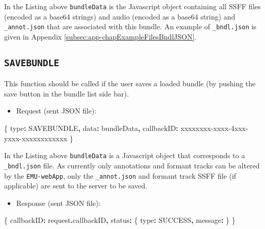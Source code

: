 \documentclass[
]{book}
\newenvironment{Shaded}{\begin{snugshade}}{\end{snugshade}}
\newcommand{\AttributeTok}[1]{\textcolor[rgb]{0.77,0.63,0.00}{#1}}
\newcommand{\NormalTok}[1]{#1}
\newcommand{\OperatorTok}[1]{\textcolor[rgb]{0.81,0.36,0.00}{\textbf{#1}}}
\newcommand{\StringTok}[1]{\textcolor[rgb]{0.31,0.60,0.02}{#1}}
\providecommand{\tightlist}{%
  \setlength{\itemsep}{0pt}\setlength{\parskip}{0pt}}
\begin{document}
In the Listing above \texttt{bundleData} is the Javascript object containing all SSFF files (encoded as a base64 strings) and audio (encoded as a base64 string) and \texttt{\_annot.json} that are associated with this bundle. An example of \texttt{\_bndl.json} is given in Appendix \ref{subsec:app-chapExampleFilesBndlJSON}.

\hypertarget{savebundle}{%
\subsection{\texorpdfstring{\texttt{SAVEBUNDLE}}{SAVEBUNDLE}}\label{savebundle}}

This function should be called if the user saves a loaded bundle (by pushing the save button in the bundle list side bar).

\begin{itemize}
\tightlist
\item
  Request (sent JSON file):
\end{itemize}

\begin{Shaded}
\begin{Highlighting}[]
\NormalTok{\{}
  \StringTok{\textquotesingle{}type\textquotesingle{}}\OperatorTok{:} \StringTok{\textquotesingle{}SAVEBUNDLE\textquotesingle{}}\OperatorTok{,}
  \StringTok{\textquotesingle{}data\textquotesingle{}}\OperatorTok{:}\NormalTok{ bundleData}\OperatorTok{,}
  \StringTok{\textquotesingle{}callbackID\textquotesingle{}}\OperatorTok{:} \StringTok{\textquotesingle{}xxxxxxxx{-}xxxx{-}4xxx{-}yxxx{-}xxxxxxxxxxxx\textquotesingle{}}
\NormalTok{\}}
\end{Highlighting}
\end{Shaded}

In the Listing above \texttt{bundleData} is a Javascript object that corresponds to a \texttt{\_bndl.json} file. As currently only annotations and formant tracks can be altered by the \texttt{EMU-webApp}, only the \texttt{\_annot.json} and formant track SSFF file (if applicable) are sent to the server to be saved.

\begin{itemize}
\tightlist
\item
  Response (sent JSON file):
\end{itemize}

\begin{Shaded}
\begin{Highlighting}[]
\NormalTok{\{}
  \StringTok{\textquotesingle{}callbackID\textquotesingle{}}\OperatorTok{:}\NormalTok{ request}\OperatorTok{.}\AttributeTok{callbackID}\OperatorTok{,}
  \StringTok{\textquotesingle{}status\textquotesingle{}}\OperatorTok{:}\NormalTok{ \{}
    \StringTok{\textquotesingle{}type\textquotesingle{}}\OperatorTok{:} \StringTok{\textquotesingle{}SUCCESS\textquotesingle{}}\OperatorTok{,}
    \StringTok{\textquotesingle{}message\textquotesingle{}}\OperatorTok{:} \StringTok{\textquotesingle{}\textquotesingle{}}
\NormalTok{  \}}
\NormalTok{\}}
\end{Highlighting}
\end{Shaded}
\end{document}
